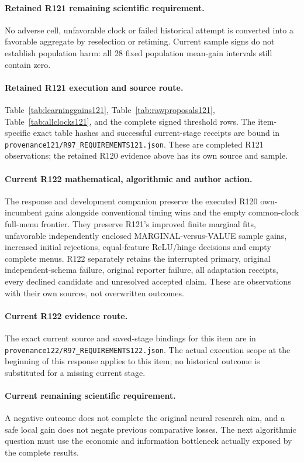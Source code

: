 \paragraph{Retained R121 remaining scientific requirement.}
No adverse cell, unfavorable clock or failed historical attempt is converted into a favorable aggregate by reselection or retiming. Current sample signs do not establish population harm: all 28 fixed population mean-gain intervals still contain zero.

\paragraph{Retained R121 execution and source route.}
Table~\ref{tab:learninggains121}, Table~\ref{tab:rawproposals121}, Table~\ref{tab:allclocks121}, and the complete signed threshold rows.
The item-specific exact table hashes and successful current-stage receipts are bound in \nolinkurl{provenance121/R97_REQUIREMENTS121.json}. These are completed R121 observations; the retained R120 evidence above has its own source and sample.
\paragraph{Current R122 mathematical, algorithmic and author action.}
The response and development companion preserve the executed R120 own-incumbent gains alongside conventional timing wins and the empty common-clock full-menu frontier. They preserve R121's improved finite marginal fits, unfavorable independently enclosed MARGINAL-versus-VALUE sample gains, increased initial rejections, equal-feature ReLU/hinge decisions and empty complete menus. R122 separately retains the interrupted primary, original independent-schema failure, original reporter failure, all adaptation receipts, every declined candidate and unresolved accepted claim. These are observations with their own sources, not overwritten outcomes.
\paragraph{Current R122 evidence route.}
The exact current source and saved-stage bindings for this item are in \nolinkurl{provenance122/R97_REQUIREMENTS122.json}. The actual execution scope at the beginning of this response applies to this item; no historical outcome is substituted for a missing current stage.
\paragraph{Current remaining scientific requirement.}
A negative outcome does not complete the original neural research aim, and a safe local gain does not negate previous comparative losses. The next algorithmic question must use the economic and information bottleneck actually exposed by the complete results.

